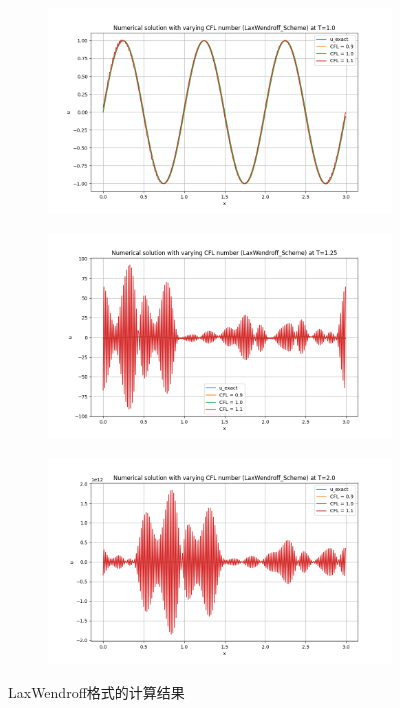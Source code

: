 \documentclass[12pt, a4paper]{article}
\begin{document}
\begin{figure}[htbp]
    \centering
    \begin{subfigure}[b]{0.45\textwidth} 
        \centering
        \includegraphics[width=\textwidth]{./pictures/Stablity_of_LaxWendroff_Scheme_at_1.0.png} 
    \end{subfigure}
    \hfill
    \begin{subfigure}[b]{0.45\textwidth} 
        \centering
        \includegraphics[width=\textwidth]{./pictures/Stablity_of_LaxWendroff_Scheme_at_1.25.png} 
    \end{subfigure}
    \vspace{0.5cm}
    \centering
    \begin{subfigure}[b]{0.45\textwidth} 
        \centering
        \includegraphics[width=\textwidth]{./pictures/Stablity_of_LaxWendroff_Scheme_at_2.0.png} 
    \end{subfigure}
    \caption{LaxWendroff格式的计算结果}
\end{figure}
\end{document}
